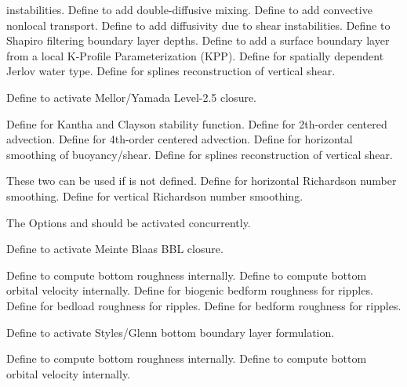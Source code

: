 \begin{klist}
\begin{klist}
\begin{klist}
   instabilities.
       Define to add double-diffusive mixing.
      Define to add convective nonlocal transport.
       Define to add diffusivity due to shear
   instabilities.
       Define to Shapiro filtering boundary layer
   depths.
       Define to add a surface boundary layer from a local
   K-Profile Parameterization (KPP).
       Define for spatially dependent Jerlov
     water type.
         Define for splines reconstruction of
       vertical shear.
    \end{klist}
       Define to activate Mellor/Yamada Level-2.5
   closure.
    \begin{klist}
         Define for Kantha and Clayson stability
       function.
         Define for 2th-order centered advection.
         Define for 4th-order centered advection.
         Define for horizontal smoothing of
       buoyancy/shear.
         Define for splines reconstruction of
       vertical shear.
    \end{klist}
    These two can be used if  is not defined.
       Define for horizontal Richardson number
   smoothing.
       Define for vertical Richardson number
   smoothing.
  \end{klist}
   \mbox{}
  The Options  and  should be activated concurrently.
    \begin{klist}
       Define to activate Meinte Blaas BBL closure.
      \begin{klist}
         Define to compute bottom roughness
      internally.
         Define to compute bottom orbital velocity
    internally.
         Define for biogenic bedform roughness for
    ripples.
         Define for bedload roughness for ripples.
         Define for bedform roughness for ripples.
      \end{klist}
       Define to activate Styles/Glenn bottom
   boundary layer formulation.
      \begin{klist}
         Define to compute bottom roughness
     internally.
         Define to compute bottom orbital velocity
    internally.

\end{klist}
\end{klist}
\end{klist}
